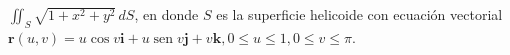 \item $\iint_S \sqrt{1 + x^2 + y^2} \, dS$, en donde $S$ es la superficie helicoide con ecuación vectorial $\mathbf{r}(u, v) = u \cos v\mathbf{i} + u \operatorname{sen} v\mathbf{j} + v\mathbf{k}, 0 \le u \le 1, 0 \le v \le \pi$.
